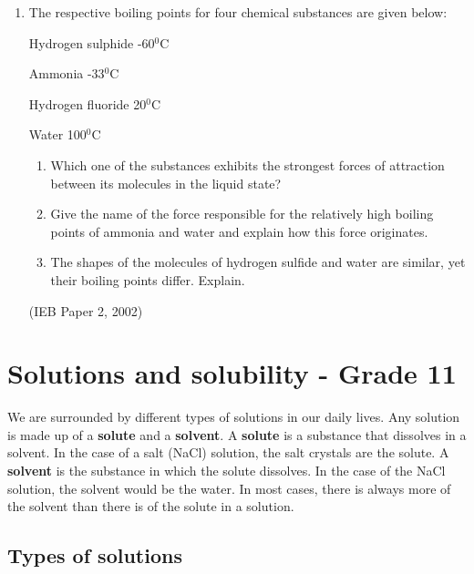 {\begin{enumerate}
\item{The respective boiling points for four chemical substances are given below:

Hydrogen sulphide -60$^{0}$C

Ammonia -33$^{0}$C

Hydrogen fluoride 20$^{0}$C

Water 100$^{0}$C

		\begin{enumerate}
		\item{Which one of the substances exhibits the strongest forces of attraction between its molecules in the liquid state?}
		\item{Give the name of the force responsible for the relatively high boiling points of ammonia and water and explain how this force originates.}
		\item{The shapes of the molecules of hydrogen sulfide and water are similar, yet their boiling points differ. Explain.}
		\end{enumerate} 

}
(IEB Paper 2, 2002)
\end{enumerate}
}






\chapter{Solutions and solubility - Grade 11}
\label{chap:solutions}

We are surrounded by different types of solutions in our daily lives. Any solution is made up of a \textbf{solute} and a \textbf{solvent}. A \textbf{solute} is a substance that dissolves in a solvent. In the case of a salt (NaCl) solution, the salt crystals are the solute. A \textbf{solvent} is the substance in which the solute dissolves. In the case of the NaCl solution, the solvent would be the water. In most cases, there is always more of the solvent than there is of the solute in a solution.


   
\section{Types of solutions}
\label{sec:soln:types}

